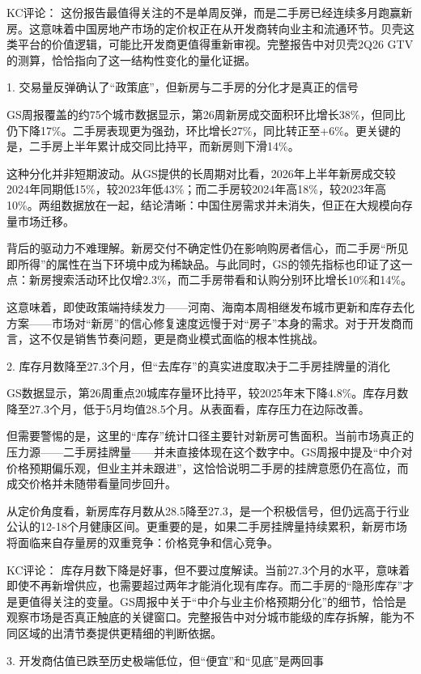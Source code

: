 \documentclass[11pt]{ctexart}
\begin{document}
KC评论： 这份报告最值得关注的不是单周反弹，而是二手房已经连续多月跑赢新房。这意味着中国房地产市场的定价权正在从开发商转向业主和流通环节。贝壳这类平台的价值逻辑，可能比开发商更值得重新审视。完整报告中对贝壳2Q26 GTV的测算，恰恰指向了这一结构性变化的量化证据。

1. 交易量反弹确认了“政策底”，但新房与二手房的分化才是真正的信号

GS周报覆盖的约75个城市数据显示，第26周新房成交面积环比增长38\%，但同比仍下降17\%。二手房表现更为强劲，环比增长27\%，同比转正至+6\%。更关键的是，二手房上半年累计成交同比持平，而新房则下滑14\%。

这种分化并非短期波动。从GS提供的长周期对比看，2026年上半年新房成交较2024年同期低15\%，较2023年低43\%；而二手房较2024年高18\%，较2023年高10\%。两组数据放在一起，结论清晰：中国住房需求并未消失，但正在大规模向存量市场迁移。

背后的驱动力不难理解。新房交付不确定性仍在影响购房者信心，而二手房“所见即所得”的属性在当下环境中成为稀缺品。与此同时，GS的领先指标也印证了这一点：新房搜索活动环比仅增2.3\%，而二手房带看和认购分别环比增长10\%和14\%。

这意味着，即使政策端持续发力——河南、海南本周相继发布城市更新和库存去化方案——市场对“新房”的信心修复速度远慢于对“房子”本身的需求。对于开发商而言，这不仅是销售节奏问题，更是商业模式面临的根本性挑战。

2. 库存月数降至27.3个月，但“去库存”的真实进度取决于二手房挂牌量的消化

GS数据显示，第26周重点20城库存量环比持平，较2025年末下降4.8\%。库存月数降至27.3个月，低于5月均值28.5个月。从表面看，库存压力在边际改善。

但需要警惕的是，这里的“库存”统计口径主要针对新房可售面积。当前市场真正的压力源——二手房挂牌量——并未直接体现在这个数字中。GS周报中提及“中介对价格预期偏乐观，但业主并未跟进”，这恰恰说明二手房的挂牌意愿仍在高位，而成交价格并未随带看量同步回升。

从定价角度看，新房库存月数从28.5降至27.3，是一个积极信号，但仍远高于行业公认的12-18个月健康区间。更重要的是，如果二手房挂牌量持续累积，新房市场将面临来自存量房的双重竞争：价格竞争和信心竞争。

KC评论： 库存月数下降是好事，但不要过度解读。当前27.3个月的水平，意味着即使不再新增供应，也需要超过两年才能消化现有库存。而二手房的“隐形库存”才是更值得关注的变量。GS周报中关于“中介与业主价格预期分化”的细节，恰恰是观察市场是否真正触底的关键窗口。完整报告中对分城市能级的库存拆解，能为不同区域的出清节奏提供更精细的判断依据。

3. 开发商估值已跌至历史极端低位，但“便宜”和“见底”是两回事
\end{document}
